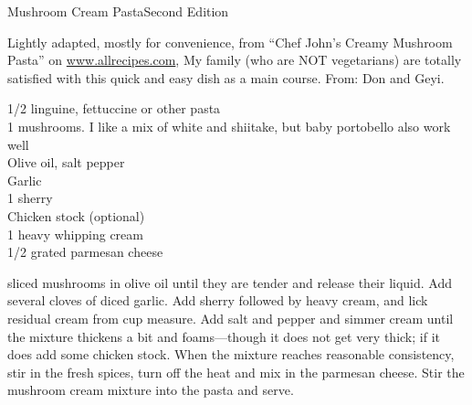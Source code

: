 
\begin{entry}{Mushroom Cream Pasta}{Second Edition}

\begin{open}
    Lightly adapted, mostly for convenience, from ``Chef John's Creamy Mushroom
    Pasta'' on \url{www.allrecipes.com}, My family (who are NOT vegetarians) are
    totally satisfied with this quick and easy dish as a main course. From: Don
    and Geyi.
\end{open}
\begin{ingredients}
    \SI{1/2}{\pound} linguine, fettuccine or other pasta\\
    \SI{1}{\pound} mushrooms. I like a mix of white and shiitake, but baby
    portobello also work well\\
    Olive oil, salt pepper\\
    Garlic\\
    \SI{1}{\tblspoon} sherry\\
    Chicken stock (optional)\\
    \SI{1}{\cup} heavy whipping cream\\
    \SI{1/2}{\cup} grated parmesan cheese
\end{ingredients}
\Saute sliced mushrooms in olive oil until they are tender and release their
liquid. Add several cloves of diced garlic. Add sherry followed by heavy cream,
and lick residual cream from cup measure. Add salt and pepper and simmer cream
until the mixture thickens a bit and foams---though it does not get very thick;
if it does add some chicken stock. When the mixture reaches reasonable
consistency, stir in the fresh spices, turn off the heat and mix in the parmesan
cheese. Stir the mushroom cream mixture into the pasta and serve.
\end{entry}


